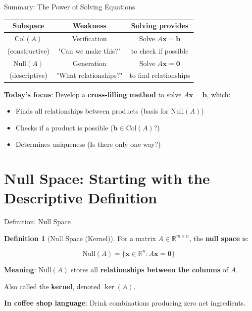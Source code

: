 \documentclass[10pt]{beamer}
\theoremstyle{definition}
\newtheorem{defi}{Definition}[section]
\newcommand{\x}[1]{\alert{\textbf{#1}}}
\begin{document}
\begin{frame}{Summary: The Power of Solving Equations}

\begin{center}
\begin{tabular}{|c|c|c|}
\hline
\textbf{Subspace} & \textbf{Weakness} & \textbf{Solving provides} \\
\hline
$\text{Col}(A)$ & Verification & Solve $A\mathbf{x}=\mathbf{b}$ \\
(constructive) & "Can we make this?" & to check if possible \\
\hline
$\text{Null}(A)$ & Generation & Solve $A\mathbf{x}=\mathbf{0}$ \\
(descriptive) & "What relationships?" & to find relationships \\
\hline
\end{tabular}
\end{center}

\vspace{1em}

\x{Today's focus}: Develop a \textbf{cross-filling method} to solve $A\mathbf{x} = \mathbf{b}$, which:

\begin{itemize}
\item Finds all relationships between products (basis for $\text{Null}(A)$)
\item Checks if a product is possible ($\mathbf{b} \in \text{Col}(A)$?)
\item Determines uniqueness (Is there only one way?)
\end{itemize}

\end{frame}

\section{Null Space: Starting with the Descriptive Definition}

\begin{frame}{Definition: Null Space}

\begin{defi}[Null Space (Kernel)]
For a matrix $A \in \mathbb{R}^{m \times n}$, the \x{null space} is:

$$\text{Null}(A) = \{\mathbf{x} \in \mathbb{R}^n : A\mathbf{x} = \mathbf{0}\}$$

\textbf{Meaning}: $\text{Null}(A)$ stores all \x{relationships between the columns} of $A$.

Also called the \x{kernel}, denoted $\ker(A)$.
\end{defi}

\vspace{0.5em}

\x{In coffee shop language}: Drink combinations producing zero net ingredients.

\end{frame}
\end{document}
